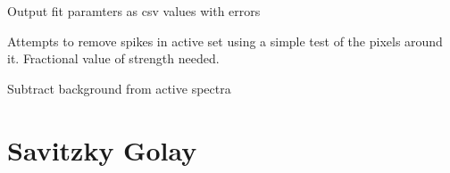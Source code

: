 \documentclass[letterpaper,10pt,english]{sphinxmanual}
\begin{document}
\begin{fulllineitems}

\begin{fulllineitems}
\label{spectra:spectra.Spectra.output_results}
Output fit paramters as csv values with errors

\end{fulllineitems}


\begin{fulllineitems}
\label{spectra:spectra.Spectra.remove_spikes}
Attempts to remove spikes in active set using a simple test of 
the pixels around it. Fractional value of strength needed.

\end{fulllineitems}


\begin{fulllineitems}
\label{spectra:spectra.Spectra.subtract_background}
Subtract background from active spectra

\end{fulllineitems}


\end{fulllineitems}



\chapter{Savitzky Golay}
\label{savitzky_golay:savitzky-golay}\label{savitzky_golay::doc}
\end{document}
